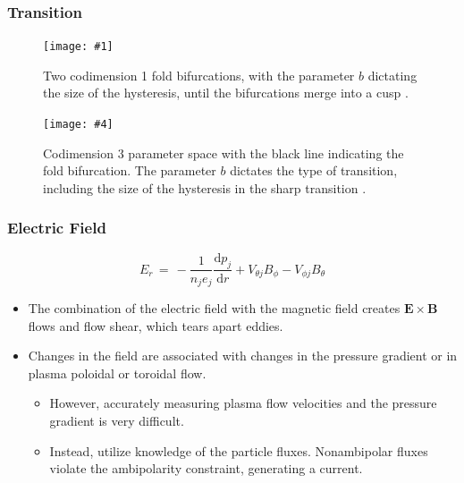 \documentclass{beamer}
\newcommand\TwoFig[6]{%
	\sbox\IBoxA{\texttt{[image: \#1]}}
	\sbox\IBoxB{\texttt{[image: \#4]}}%
	\ifdim\ht\IBoxA>\ht\IBoxB
		\setlength\IHeight{\ht\IBoxB}%
	\else\setlength\IHeight{\ht\IBoxA}\fi
	\begin{figure}[ht]
		\minipage[t]{0.49\textwidth}\centering
			\texttt{[image: \#1]}
			\caption{#2}\label{#3}
		\endminipage\hfill
		\minipage[t]{0.49\textwidth}\centering
			\texttt{[image: \#4]}
			\caption{#5}\label{#6}
		\endminipage
	\end{figure}%
}
\begin{document}
\begin{frame}
\frametitle{Transition}
\TwoFig{../../Graphics/Bif_3D.png}
	{Two codimension 1 fold bifurcations, with the parameter $b$ dictating the size of the hysteresis, until the bifurcations merge into a cusp \cite{weymiens_bifurcation_2014}.}
	{fig:Bif_3D}
	{../../Graphics/3_transitions_single_simple.png}
	{Codimension 3 parameter space with the black line indicating the fold bifurcation. The parameter $b$ dictates the type of transition, including the size of the hysteresis in the sharp transition \cite{weymiens_bifurcation_2014}.}
	{fig:Bif_types}
\end{frame}


\begin{frame}
\frametitle{Electric Field}
\begin{equation}
	E_r \,=\, -\frac{1}{n_j e_j} \frac{\text{d}p_j}{\text{d}r} + V_{\theta j} B_\phi - V_{\phi j} B_\theta
	\label{eq:E_r}
\end{equation}
\begin{itemize}
	\item The combination of the electric field with the magnetic field creates $\mathbf{E}\times\mathbf{B}$ flows and flow shear, which tears apart eddies.
	\item Changes in the field are associated with changes in the pressure gradient or in plasma poloidal or toroidal flow.
	\begin{itemize}
		\item However, accurately measuring plasma flow velocities and the pressure gradient is very difficult.
		\item Instead, utilize knowledge of the particle fluxes. Nonambipolar fluxes violate the ambipolarity constraint, generating a current.
	\end{itemize}
\end{itemize}
\end{frame}
\end{document}

